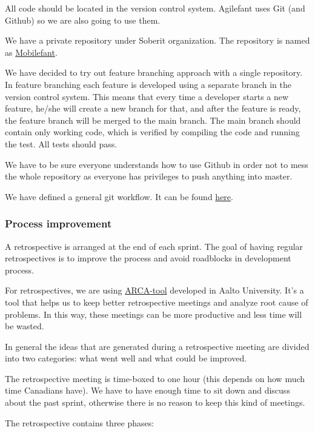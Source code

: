 All code should be located in the version control system.
Agilefant uses Git (and Github) so we are also going to use 
them.

We have a private repository under Soberit organization. The repository is named as \href{https://github.com/soberit/mobilefant}{Mobilefant}.

We have decided to try out feature branching approach with a single repository. In feature branching each feature is developed using a separate 
branch in the version control system. This means that every time 
a developer starts a new feature, he/she will create a new 
branch for that, and after the feature is ready, the feature 
branch will be merged to the main branch. The main branch should 
contain only working code, which is verified by compiling the 
code and running the test. All tests should pass.

We have to be sure everyone understands how to use Github in order not to mess the whole repository as everyone has privileges to push anything into master.

We have defined a general git workflow. It can be found \href{https://docs.google.com/document/d/1wAih0JzkrZ4ySUZ_MO-F8MvGkPXKHicYbG1972Sxo2w/edit?usp=sharing}{here}.

\subsubsection{Process improvement}

A retrospective is arranged at the end of each sprint. The goal of having 
regular retrospectives is to improve the process and avoid roadblocks in 
development process.

For retrospectives, we are using \href{http://wirca.soberit.hut.fi/prod/}{ARCA-tool} developed in Aalto University. It's a tool that helps us to keep better retrospective meetings and analyze root cause of problems. In this way, these meetings can be more productive and less time will be wasted.

In general the ideas that are generated during a retrospective meeting are divided into two categories: what went well and what could be improved. 

The retrospective meeting is time-boxed to one hour (this depends on how much time 
Canadians have). We have to have enough time to sit down and discuss about the 
past sprint, otherwise there is no reason to keep this kind of meetings. 

The retrospective contains three phases:

